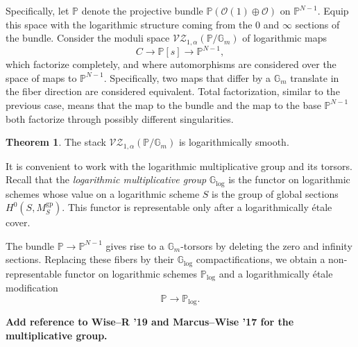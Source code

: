 \documentclass[11pt]{amsart}
\renewcommand{\to}{\rightarrow}
\theoremstyle{definition}
\newtheorem{thm}{Theorem}[section]
\theoremstyle{definition}
\begin{document}
Specifically, let $\mathbb P$ denote the projective bundle $\mathbb P(\mathcal O(1)\oplus\mathcal O)$ on $\mathbb P^{N-1}$. Equip this space with the logarithmic structure coming from the $0$ and $\infty$ sections of the bundle. Consider the moduli space $\mathcal{VZ}_{1,\alpha}(\mathbb P/\mathbb G_m)$ of logarithmic maps
\[
C\to \mathbb P[s]\to \mathbb P^{N-1},
\]
which factorize completely, and where automorphisms are considered over the space of maps to $\mathbb P^{N-1}$. Specifically, two maps that differ by a $\mathbb G_m$ translate in the fiber direction are considered equivalent. Total factorization, similar to the previous case, means that the map to the bundle and the map to the base $\mathbb P^{N-1}$ both factorize through possibly different singularities. 

\begin{thm}
The stack $\mathcal{VZ}_{1,\alpha}(\mathbb P/\mathbb G_m)$ is logarithmically smooth.
\end{thm}

It is convenient to work with the logarithmic multiplicative group and its torsors. Recall that the \textit{logarithmic multiplicative group} $\mathbb G_{\mathrm{log}}$ is the functor on logarithmic schemes whose value on a logarithmic scheme $S$ is the group of global sections $H^0(S,M_S^{\mathrm{gp}})$. This functor is representable only after a logarithmically \'etale cover. 

The bundle $\mathbb P\to \mathbb P^{N-1}$ gives rise to a $\mathbb G_m$-torsors by deleting the zero and infinity sections. Replacing these fibers by their $\mathbb G_{\mathrm{log}}$ compactifications, we obtain a non-representable functor on logarithmic schemes $\mathbb P_{\mathrm{log}}$ and a logarithmically \'etale modification
\[
\mathbb P\to \mathbb P_{\mathrm{log}}.
\]

{\bf Add reference to Wise--R '19 and Marcus--Wise '17 for the multiplicative group.}
\end{document}

